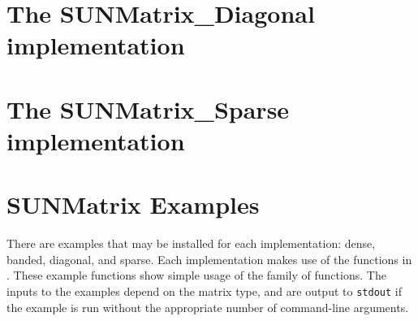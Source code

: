 \section{The SUNMatrix\_Diagonal implementation}\label{ss:sunmat_diag}


\section{The SUNMatrix\_Sparse implementation}\label{ss:sunmat_sparse}



\section{SUNMatrix Examples}\label{ss:sunmat_examples}

There are  examples that may be installed for each
implementation: dense, banded, diagonal, and sparse.  Each implementation
makes use of the functions in . 
These example functions show simple usage of the  family
of functions.  The inputs to the examples depend on the matrix type,
and are output to \texttt{stdout} if the example is run without the
appropriate number of command-line arguments. 

